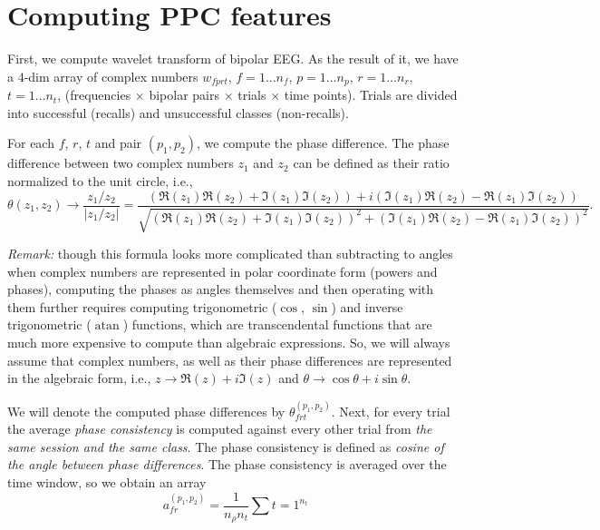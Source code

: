 \documentclass[a4paper]{article}
\DeclareMathOperator{\atan}{atan}
\begin{document}
\section*{Computing PPC features}

First, we compute wavelet transform of bipolar EEG. As the result of it, we have a $4$-dim
array of complex numbers $w_{fprt}$, $f = 1 \ldots n_f$, $p = 1 \ldots n_p$, $r = 1 \ldots n_r$,
$t = 1 \ldots n_t$, (frequencies $\times$ bipolar pairs $\times$ trials $\times$ time points).
Trials are divided into successful (recalls) and unsuccessful classes (non-recalls).

For each $f$, $r$, $t$ and pair $(p_1,p_2)$, we compute the phase difference. The phase
difference between two complex numbers $z_1$ and $z_2$ can be defined as their ratio normalized
to the unit circle, i.e.,
\[ \theta(z_1,z_2) \to \frac{z_1/z_2}{|z_1/z_2|} = \frac{\left(\Re(z_1) \Re(z_2) + \Im(z_1) \Im(z_2)\right) + i \left(\Im(z_1) \Re(z_2) - \Re(z_1) \Im(z_2)\right)}{\sqrt{\left(\Re(z_1) \Re(z_2) + \Im(z_1) \Im(z_2)\right)^2 + \left(\Im(z_1) \Re(z_2) - \Re(z_1) \Im(z_2)\right)^2}}. \]

{\em Remark:} though this formula looks more complicated than subtracting to angles when
complex numbers are represented in polar coordinate form (powers and phases), computing
the phases as angles themselves and then operating with them further requires computing
trigonometric ($\cos$, $\sin$) and inverse trigonometric ($\atan$) functions, which are
transcendental functions that are much more expensive to compute than algebraic expressions.
So, we will always assume that complex numbers, as well as their phase differences are
represented in the algebraic form, i.e., $z \to \Re(z) + i \Im(z)$ and
$\theta \to \cos\theta + i \sin\theta$.

We will denote the computed phase differences by $\theta_{frt}^{(p_1,p_2)}$. Next, for every
trial the average {\em phase consistency\/} is computed against every other trial from
{\em the same session and the same class\/}. The phase consistency is defined as
{\em cosine of the angle between phase differences\/}. The phase consistency is averaged over
the time window, so we obtain an array
\[a_{fr}^{(p_1,p_2)} = \frac{1}{n_{\rho} n_t} \sum{t=1}^{n_t}  \]
\end{document}
